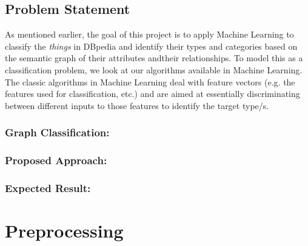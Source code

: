 \documentclass[runningheads,a4paper]{llncs}
\begin{document}
\subsection{Problem Statement}
As mentioned earlier, the goal of this project is to apply Machine Learning 
to classify the \textit{things} in DBpedia and identify their types and categories
based on the semantic graph of 
their attributes andtheir relationships. 
To model this as a classification problem, we look at our algorithms
available in Machine Learning. The classic algorithms in Machine Learning
deal with feature vectors (e.g. the features used for classification, etc.) and are aimed
at essentially discriminating between different inputs to those features to identify the target type/s. 

\subsubsection{Graph Classification:}

\subsubsection{Proposed Approach:}

\subsubsection{Expected Result:}

\section{Preprocessing}



\end{document}
